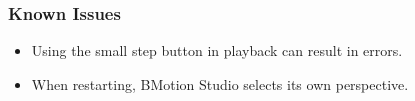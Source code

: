 \subsubsection{Known Issues}
\label{sec:known-issues}

\begin{itemize}
	\item Using the small step button in playback can result in errors.
	\item When restarting, BMotion Studio selects its own perspective.
\end{itemize}


